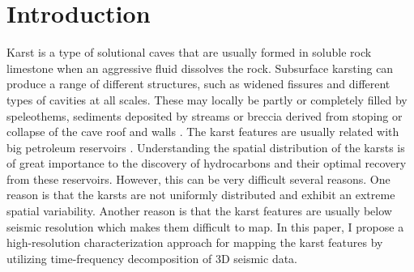 
\section{Introduction} 
Karst is a type of solutional caves that are usually formed in  soluble rock limestone when an aggressive fluid dissolves the rock. Subsurface karsting can produce a range of different structures, such as widened fissures and different types of cavities at all scales.  These may locally be partly or completely filled by
speleothems, sediments deposited by streams or breccia derived from stoping or collapse of the cave roof and walls \cite[]{karstthesis}.  %
The karst features are usually related with big petroleum reservoirs \cite[]{karstford}. Understanding the spatial distribution of the karsts is of great importance to the discovery of hydrocarbons and their optimal recovery from these reservoirs. However, this can be very difficult  several reasons. One reason is that the karsts are not uniformly distributed and exhibit an extreme spatial variability. Another reason is that the karst features are usually below seismic resolution\new{,} which makes them difficult to map. In this paper, I propose a high-resolution characterization approach for mapping the karst features by utilizing time-frequency decomposition of 3D seismic data.
 
